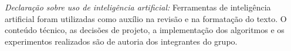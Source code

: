 \documentclass[
  12pt,
  oneside,
  a4paper,
  brazil
]{abntex2}
\begin{document}
\noindent\textit{Declaração sobre uso de inteligência artificial:}
Ferramentas de inteligência artificial foram utilizadas como auxílio na
revisão e na formatação do texto. O conteúdo técnico, as decisões de
projeto, a implementação dos algoritmos e os experimentos realizados
são de autoria dos integrantes do grupo.

\postextual

\end{document}

